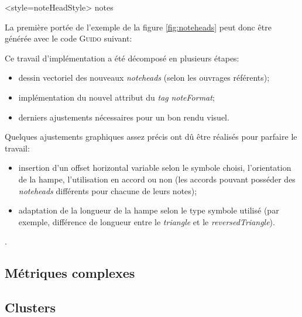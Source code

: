 \documentclass{article}
\newenvironment{gmncode}	{\vspace{-2mm}\small\verbatim}{\endverbatim\vspace{-2mm}}
\begin{document}
\begin{gmncode}
\noteFormat<style=noteHeadStyle> notes
\end{gmncode}

La première portée de l'exemple de la figure \ref{fig:noteheads} peut donc être générée avec le code \textsc{Guido} suivant:

\begin{gmncode}
[
  \noteFormat<style="x"> a
  \noteFormat<style="diamond"> a
  \noteFormat<style="round"> a
  \noteFormat<style="square"> a
  \noteFormat<style="triangle"> a
  \noteFormat<style="reversedTriangle"> a
]
\end{gmncode}
\bigskip

Ce travail d'implémentation a été décomposé en plusieurs étapes:
\begin{itemize}
    \item dessin vectoriel des nouveaux \emph{noteheads} (selon les ouvrages référents);
    \item implémentation du nouvel attribut du \emph{tag} \emph{noteFormat};
    \item derniers ajustements nécessaires pour un bon rendu visuel.
\end{itemize}

Quelques ajustements graphiques assez précis ont dû être réalisés pour parfaire le travail:
\begin{itemize}
    \item insertion d'un offset horizontal variable selon le symbole choisi, l'orientation de la hampe, l'utilisation en accord ou non (les accords pouvant posséder des \emph{noteheads} différents pour chacune de leurs notes);
    \item adaptation de la longueur de la hampe selon le type symbole utilisé (par exemple, différence de longueur entre le \emph{triangle} et le \emph{reversedTriangle}).
\end{itemize}.


\subsection{Métriques complexes}\label{subsec:metriques}



\subsection{Clusters}\label{subsec:clusters}
\end{document}
